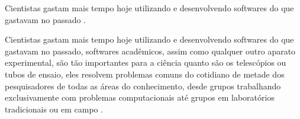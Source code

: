 %
%
%

Cientistas gastam mais tempo hoje utilizando e
desenvolvendo softwares do que gastavam no passado \cite{wilson2014best}.

Cientistas gastam mais tempo hoje utilizando e desenvolvendo softwares do que
gastavam no passado, softwares acadêmicos, assim como qualquer outro aparato
experimental, são tão importantes para a ciência quanto são os telescópios ou
tubos de ensaio, eles resolvem problemas comuns do cotidiano de metade dos
pesquisadores de todas as áreas do conhecimento, desde grupos trabalhando
exclusivamente com problemas computacionais até grupos em laboratórios
tradicionais ou em campo \cite{wilson2014best}.



